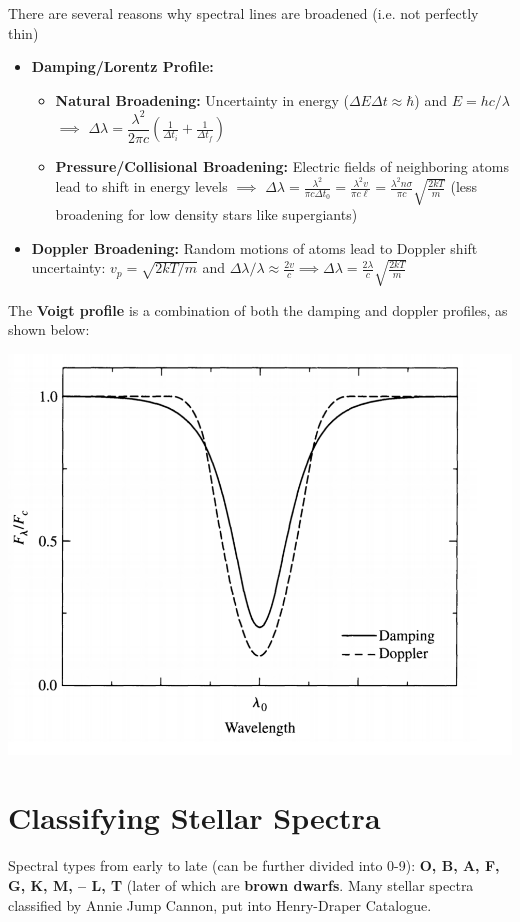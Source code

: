 \documentclass[12pt]{article}
\begin{document}
There are several reasons why spectral lines are broadened (i.e. not perfectly thin)
\begin{itemize}
    \item \textbf{Damping/Lorentz Profile:}
    \begin{itemize}
    \item \textbf{Natural Broadening:} Uncertainty in energy ($\Delta E\Delta t \approx\hbar$) and $E = hc/\lambda$ $\implies$ $\Delta\lambda = \dfrac{\lambda^2}{2\pi c}\left(\frac{1}{\Delta t_i} + \frac{1}{\Delta t_f}\right)$
    \item \textbf{Pressure/Collisional Broadening:} Electric fields of neighboring atoms lead to shift in energy levels $\implies$ $\Delta\lambda = \frac{\lambda^2}{\pi c\Delta t_0} = \frac{\lambda^2v}{\pi c\ell} = \frac{\lambda^2n\sigma}{\pi c}\sqrt{\frac{2kT}{m}}$ (less broadening for low density stars like supergiants)
    \end{itemize}
    \item \textbf{Doppler Broadening:} Random motions of atoms lead to Doppler shift uncertainty: $v_p = \sqrt{2kT/m}$ and $\Delta\lambda/\lambda \approx \frac{2v}{c} \implies \Delta\lambda = \frac{2\lambda}{c}\sqrt{\frac{2kT}{m}}$
\end{itemize}

The \textbf{Voigt profile} is a combination of both the damping and doppler profiles, as shown below:

\includegraphics[scale=0.5]{Figures/VoigtProfile.png}

\section{Classifying Stellar Spectra}
Spectral types from early to late (can be further divided into 0-9): \textbf{O, B, A, F, G, K, M, -- L, T} (later of which are \textbf{brown dwarfs}. Many stellar spectra classified by Annie Jump Cannon, put into Henry-Draper Catalogue.
\end{document}
